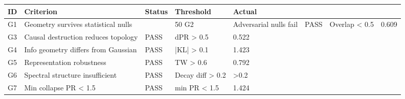 \begin{tabular}{lllll}
\toprule
ID & Criterion & Status & Threshold & Actual \\
\midrule
G1 & Geometry survives statistical nulls & ~ & 50%
G2 & Adversarial nulls fail & PASS & Overlap < 0.5 & 0.609 \\
G3 & Causal destruction reduces topology & PASS & dPR > 0.5 & 0.522 \\
G4 & Info geometry differs from Gaussian & PASS & |KL| > 0.1 & 1.423 \\
G5 & Representation robustness & PASS & TW > 0.6 & 0.792 \\
G6 & Spectral structure insufficient & PASS & Decay diff > 0.2 & >0.2 \\
G7 & Min collapse PR < 1.5 & PASS & min PR < 1.5 & 1.424 \\
\bottomrule
\end{tabular}
